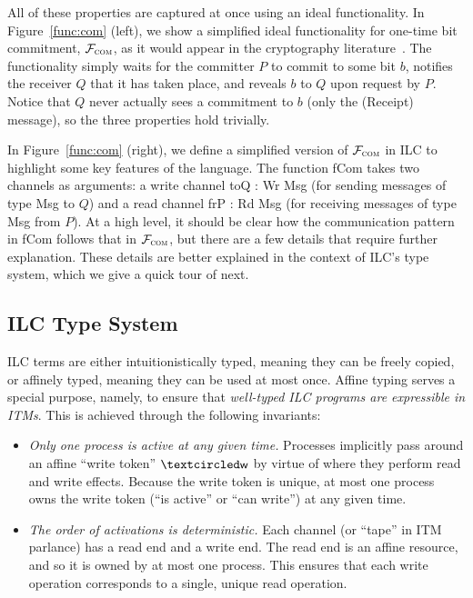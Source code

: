 %
All of these properties are captured at once using an ideal functionality. In
Figure~\ref{func:com} (left), we show a simplified ideal functionality for
one-time bit commitment, $\mathcal{{F}}_{\textsc{com}}$, as it would appear in the
cryptography literature~\cite{canetti2001commitments}. The functionality simply
waits for the committer $P$ to commit to some bit $b$, notifies the receiver $Q$
that it has taken place, and reveals $b$ to $Q$ upon request by $P$. Notice that
$Q$ never actually sees a commitment to $b$ (only the (\textsf{Receipt})
message), so the three properties hold trivially.
%

In Figure~\ref{func:com} (right), we define a simplified version of
$\mathcal{{F}}_{\textsc{com}}$ in ILC to highlight some key features of the
language. The function \textsf{fCom} takes two channels as arguments: a write
channel \textsf{toQ : Wr Msg} (for sending messages of type \textsf{Msg} to $Q$)
and a read channel \textsf{frP : Rd Msg} (for receiving messages of type
\textsf{Msg} from $P$). At a high level, it should be clear how the
communication pattern in \textsf{fCom} follows that in $\mathcal{{F}}_{\textsc{com}}$,
but there are a few details that require further explanation. These details are
better explained in the context of ILC's type system, which we give a quick tour
of next.

\subsection{ILC Type System}
\label{subsec:type-tour}

ILC terms are either intuitionistically typed, meaning they can be freely
copied, or affinely typed, meaning they can be used at most once. Affine typing
serves a special purpose, namely, to ensure that \emph{well-typed ILC programs
  are expressible in ITMs}. This is achieved through the following invariants:

\begin{itemize}[leftmargin=*]
\item \emph{Only one process is active at any given time.} Processes implicitly
  pass around an affine ``write token'' $\wrtok$ by virtue of where they perform
  read and write effects. Because the write token is unique, at most one process
  owns the write token (``is active'' or ``can write'') at any given time.
  
\item \emph{The order of activations is deterministic.} Each channel (or
  ``tape'' in ITM parlance) has a read end and a write end. The read end is an
  affine resource, and so it is owned by at most one process. This ensures that
  each write operation corresponds to a single, unique read operation.
\end{itemize}

